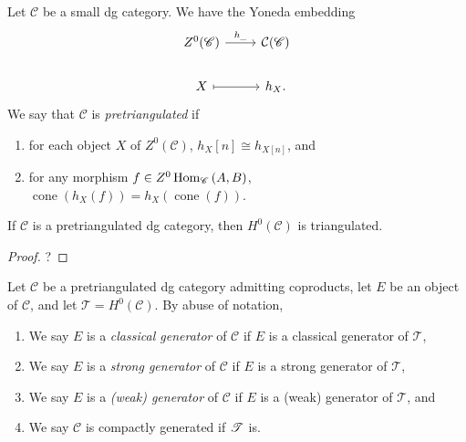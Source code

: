 \documentclass[dissertation.tex]{subfiles}
\begin{document}
\begin{defn}
  Let $\mathscr{C}$ be a small dg category.
  We have the Yoneda embedding 
  $$\begin{tikzcd}
    Z^0(\mathscr{C}) \arrow{r}{h_{\_}} & \mathcal{C}(\mathscr{C})\\
    X \arrow[mapsto]{r} & h_X.
  \end{tikzcd}$$
  We say that $\mathscr{C}$ is {\it pretriangulated} if
  \begin{enumerate}
  \item
    for each object $X$ of $Z^0(\mathscr{C})$, $h_X[n] \cong h_{X[n]}$, and
  \item
    for any morphism $f \in Z^0\operatorname{Hom}_{\mathscr{C}}\left(A,B\right)$, $\operatorname{cone}(h_X(f)) = h_X(\operatorname{cone}(f))$.
  \end{enumerate}
\end{defn}

\begin{prop}
  If $\mathscr{C}$ is a pretriangulated dg category, then $H^0(\mathscr{C})$ is triangulated.
  
  \begin{proof}
    ?
  \end{proof}
\end{prop}

\begin{defn}
  Let $\mathscr{C}$ be a pretriangulated dg category admitting coproducts, let $E$ be an object of $\mathscr{C}$, and let $\mathscr{T} = H^0(\mathscr{C})$.
  By abuse of notation, 
  \begin{enumerate}
  \item
    We say $E$ is a {\it classical generator} of $\mathscr{C}$ if $E$ is a classical generator of $\mathscr{T}$,
  \item
    We say $E$ is a {\it strong generator} of $\mathscr{C}$ if $E$ is a strong generator of $\mathscr{T}$,
  \item
    We say $E$ is a {\it (weak) generator} of $\mathscr{C}$ if $E$ is a (weak) generator of $\mathscr{T}$, and
  \item
    We say $\mathscr{C}$ is compactly generated if $\mathscr{T}$ is.
  \end{enumerate}
\end{defn}

\end{document}
